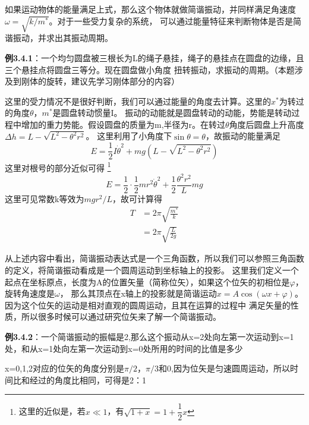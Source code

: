 \documentclass{article}
\begin{document}
    如果运动物体的能量满足上式，那么这个物体就做简谐振动，并同样满足角速度\(\omega = \sqrt{k/m^*}\)。对于一些受力复杂的系统，
    可以通过能量特征来判断物体是否是简谐振动，并求出其振动周期。

    \textbf{例3.4.1}：一个均匀圆盘被三根长为L的绳子悬挂，绳子的悬挂点在圆盘的边缘，且三个悬挂点将圆盘三等分。现在圆盘做小角度
    扭转振动，求振动的周期。（本题涉及到刚体的旋转，建议先学习刚体部分的内容）

    这里的受力情况不是很好判断，我们可以通过能量的角度去计算。这里的\(x^*\)为转过的角度\(\theta\)，\(m^*\)是圆盘转动惯量I。
    振动的动能就是圆盘转动的动能，势能是转动过程中增加的重力势能。假设圆盘的质量为m,半径为r。在转过\(\theta\)角度后圆盘上升高度\(\Delta h = L - \sqrt{L^2 - \theta^2 r^2}\)。
    这里利用了小角度下\(\sin \theta = \theta \)，故振动的能量满足
    \begin{equation*}
        E = \frac{1}{2} I \dot{\theta}^2 + mg(L-\sqrt{L^2 - \theta^2 r^2})
    \end{equation*}
    这里对根号的部分近似可得
    \footnote{这里的近似是，若\(x \ll 1\)，有\(\sqrt{1+x} = 1+\dfrac{1}{2}x\)}
    \begin{equation*}
        E =  \frac{1}{2} \cdot \frac{1}{2}mr^2 \dot{\theta}^2 + \frac{1}{2}\frac{\theta^2 r^2}{L}mg 
    \end{equation*}
    这里可见常数k等效为\(mgr^2/L\)，故可计算得
    \begin{align*}
        T &= 2\pi \sqrt{\frac{m^*}{k}} \\
          &= 2\pi \sqrt{\frac{L}{2g}}
    \end{align*}

    从上述内容中看出，简谐振动表达式是一个三角函数，所以我们可以参照三角函数的定义，将简谐振动看成是一个圆周运动到坐标轴上的投影。
    这里我们定义一个起点在坐标原点，长度为A的位置矢量（简称位矢），如果这个位矢的初相位是\(\varphi\)，旋转角速度是\(\omega\)，
    那么其顶点在x轴上的投影就是简谐运动\(x=A\cos(\omega x + \varphi)\)。因为这个位矢的运动是相对直观的圆周运动，且其在运算的过程中
    满足矢量的性质，所以很多时候可以通过研究位矢来了解一个简谐振动。

    \textbf{例3.4.2}：一个简谐振动的振幅是2,那么这个振动从x=2处向左第一次运动到x=1处，和从x=1处向左第一次运动到x=0处所用的时间的比值是多少

    x=0,1,2对应的位矢的角度分别是\(\pi/2\)，\(\pi/3\)和0,因为位矢是匀速圆周运动，所以时间比和经过的角度比相同，可得是2：1
\end{document}
